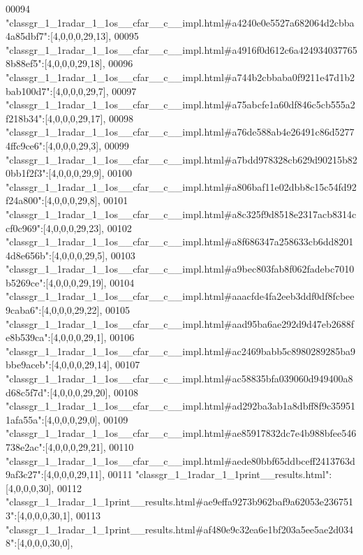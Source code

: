 \begin{DoxyCode}
00094 \textcolor{stringliteral}{"classgr\_1\_1radar\_1\_1os\_\_cfar\_\_c\_\_impl.html#a4240e0e5527a682064d2cbba4a85dbf7"}:[4,0,0,0,29,13],
00095 \textcolor{stringliteral}{"classgr\_1\_1radar\_1\_1os\_\_cfar\_\_c\_\_impl.html#a4916f0d612c6a4249340377658b88ef5"}:[4,0,0,0,29,18],
00096 \textcolor{stringliteral}{"classgr\_1\_1radar\_1\_1os\_\_cfar\_\_c\_\_impl.html#a744b2cbbaba0f9211e47d1b2bab100d7"}:[4,0,0,0,29,7],
00097 \textcolor{stringliteral}{"classgr\_1\_1radar\_1\_1os\_\_cfar\_\_c\_\_impl.html#a75abcfe1a60df846c5cb555a2f218b34"}:[4,0,0,0,29,17],
00098 \textcolor{stringliteral}{"classgr\_1\_1radar\_1\_1os\_\_cfar\_\_c\_\_impl.html#a76de588ab4e26491c86d52774ffc9ce6"}:[4,0,0,0,29,3],
00099 \textcolor{stringliteral}{"classgr\_1\_1radar\_1\_1os\_\_cfar\_\_c\_\_impl.html#a7bdd978328cb629d90215b820bb1f2f3"}:[4,0,0,0,29,9],
00100 \textcolor{stringliteral}{"classgr\_1\_1radar\_1\_1os\_\_cfar\_\_c\_\_impl.html#a806baf11e02dbb8c15c54fd92f24a800"}:[4,0,0,0,29,8],
00101 \textcolor{stringliteral}{"classgr\_1\_1radar\_1\_1os\_\_cfar\_\_c\_\_impl.html#a8c325f9d8518e2317acb8314ccf0c969"}:[4,0,0,0,29,23],
00102 \textcolor{stringliteral}{"classgr\_1\_1radar\_1\_1os\_\_cfar\_\_c\_\_impl.html#a8f686347a258633cb6dd82014d8e656b"}:[4,0,0,0,29,5],
00103 \textcolor{stringliteral}{"classgr\_1\_1radar\_1\_1os\_\_cfar\_\_c\_\_impl.html#a9bec803fab8f062fadebc7010b5269ce"}:[4,0,0,0,29,19],
00104 \textcolor{stringliteral}{"classgr\_1\_1radar\_1\_1os\_\_cfar\_\_c\_\_impl.html#aaacfde4fa2eeb3ddf0df8fcbee9caba6"}:[4,0,0,0,29,22],
00105 \textcolor{stringliteral}{"classgr\_1\_1radar\_1\_1os\_\_cfar\_\_c\_\_impl.html#aad95ba6ae292d9d47eb2688fe8b539ca"}:[4,0,0,0,29,1],
00106 \textcolor{stringliteral}{"classgr\_1\_1radar\_1\_1os\_\_cfar\_\_c\_\_impl.html#ac2469babb5c8980289285ba9bbe9aceb"}:[4,0,0,0,29,14],
00107 \textcolor{stringliteral}{"classgr\_1\_1radar\_1\_1os\_\_cfar\_\_c\_\_impl.html#ac58835bfa039060d949400a8d68c5f7d"}:[4,0,0,0,29,20],
00108 \textcolor{stringliteral}{"classgr\_1\_1radar\_1\_1os\_\_cfar\_\_c\_\_impl.html#ad292ba3ab1a8dbff8f9c359511afa55a"}:[4,0,0,0,29,0],
00109 \textcolor{stringliteral}{"classgr\_1\_1radar\_1\_1os\_\_cfar\_\_c\_\_impl.html#ae85917832dc7e4b988bfee546738e2ac"}:[4,0,0,0,29,21],
00110 \textcolor{stringliteral}{"classgr\_1\_1radar\_1\_1os\_\_cfar\_\_c\_\_impl.html#aede80bbf65ddbceff2413763d9af3c27"}:[4,0,0,0,29,11],
00111 \textcolor{stringliteral}{"classgr\_1\_1radar\_1\_1print\_\_results.html"}:[4,0,0,0,30],
00112 \textcolor{stringliteral}{"classgr\_1\_1radar\_1\_1print\_\_results.html#ae9effa9273b962baf9a62053e2367513"}:[4,0,0,0,30,1],
00113 \textcolor{stringliteral}{"classgr\_1\_1radar\_1\_1print\_\_results.html#af480e9c32ea6e1bf203a5ee5ae2d0348"}:[4,0,0,0,30,0],

\end{DoxyCode}
